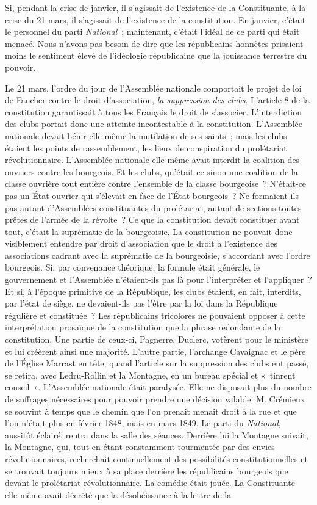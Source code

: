 \documentclass[twoside]{book} %
\begin{document}
Si, pendant la crise de janvier, il s’agissait de l’existence de la Constituante, à la crise du 21 mars, il s’agissait de l’existence de la constitution. En janvier, c’était le personnel du parti \emph{National} ; maintenant, c’était l’idéal de ce parti qui était menacé. Nous n’avons pas besoin de dire que les républicains honnêtes prisaient moins le sentiment élevé de l’idéologie républicaine que la jouissance terrestre du pouvoir.\par
Le 21 mars, l’ordre du jour de l’Assemblée nationale comportait le projet de loi de Faucher contre le droit d’association, \emph{la suppression des clubs}. L’article 8 de la constitution garantissait à tous les Français le droit de s’associer. L’interdiction des clubs portait donc une atteinte incontestable à la constitution. L’Assemblée nationale devait bénir elle-même la mutilation de ses saints ; mais les clubs étaient les points de rassemblement, les lieux de conspiration du prolétariat révolutionnaire. L’Assemblée nationale elle-même avait interdit la coalition des ouvriers contre les bourgeois. Et les clubs, qu’était-ce sinon une coalition de la classe ouvrière tout entière contre l’ensemble de la classe bourgeoise ? N’était-ce pas un État ouvrier qui s’élevait en face de l’État bourgeois ? Ne formaient-ils pas autant d’Assemblées constituantes du prolétariat, autant de sections toutes prêtes de l’armée de la révolte ? Ce que la constitution devait constituer avant tout, c’était la suprématie de la bourgeoisie. La constitution ne pouvait donc visiblement entendre par droit d’association que le droit à l’existence des associations cadrant avec la suprématie de la bourgeoisie, s’accordant avec l’ordre bourgeois. Si, par convenance théorique, la formule était générale, le gouvernement et l’Assemblée n’étaient-ils pas là pour l’interpréter et l’appliquer ? Et si, à l’époque primitive de la République, les clubs étaient, en fait, interdits, par l’état de siège, ne devaient-ils pas l’être par la loi dans la République régulière et constituée ? Les républicains tricolores ne pouvaient opposer à cette interprétation prosaïque de la constitution que la phrase redondante de la constitution. Une partie de ceux-ci, Pagnerre, Duclerc, votèrent pour le ministère et lui créèrent ainsi une majorité. L’autre partie, l’archange Cavaignac et le père de l’Église Marrast en tête, quand l’article sur la suppression des clubs eut passé, se retira, avec Ledru-Rollin et la Montagne, en un bureau spécial et « tinrent conseil ». L’Assemblée nationale était paralysée. Elle ne disposait plus du nombre de suffrages nécessaires pour pouvoir prendre une décision valable. M. Crémieux se souvint à temps que le chemin que l’on prenait menait droit à la rue et que l’on n’était plus en février 1848, mais en mars 1849. Le parti du \emph{National}, aussitôt éclairé, rentra dans la salle des séances. Derrière lui la Montagne suivait, la Montagne, qui, tout en étant constamment tourmentée par des envies révolutionnaires, recherchait continuellement des possibilités constitutionnelles et se trouvait toujours mieux à sa place derrière les républicains bourgeois que devant le prolétariat révolutionnaire. La comédie était jouée. La Constituante elle-même avait décrété que la désobéissance à la lettre de la 
\end{document}

